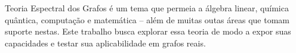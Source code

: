 \begin{resumo}

Teoria Espectral dos Grafos é um tema que permeia a álgebra linear, química quântica, computação e matemática -- além de muitas outas áreas que tomam suporte nestas. Este trabalho busca explorar essa teoria de modo a expor suas capacidades e testar sua aplicabilidade em grafos reais. 

\end{resumo}

